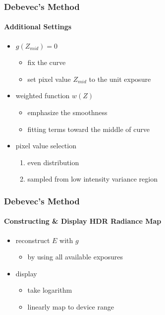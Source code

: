 \documentclass[
	11pt, %
	aspectratio=169, %
]{beamer}
\begin{document}
\begin{frame}
	\frametitle{Debevec's Method}
	\framesubtitle{Additional Settings}

	\begin{itemize}
		\item $g(Z_{mid}) = 0$
		\begin{itemize}
			\item fix the curve
			\item set pixel value $Z_{mid}$ to the unit exposure
		\end{itemize}
		\item weighted function $w(Z)$
		\begin{itemize}
			\item emphasize the smoothness
			\item fitting terms toward the middle of curve
		\end{itemize}
		\item pixel value selection
		\begin{enumerate}
			\item even distribution
			\item sampled from low intensity variance region
		\end{enumerate}
	\end{itemize}
\end{frame}


\begin{frame}
	\frametitle{Debevec's Method}
	\framesubtitle{Constructing \& Display HDR Radiance Map}

	\begin{itemize}
		\item reconstruct $E$ with $g$
		\begin{itemize}	
			\item by using all available exposures
		\end{itemize}
		\item display
		\begin{itemize}
			\item take logarithm
			\item linearly map to device range
		\end{itemize}
	\end{itemize}
\end{frame}
\end{document}
